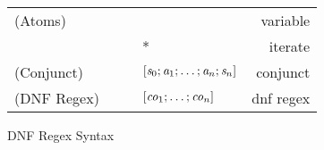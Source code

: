 \begin{figure}
\begin{tabular}{l@{\ }l@{\ }c@{\ }l@{\ }r}

(Atoms)& \Atom{} & \GEq{} & \RegexVariable{} & variable\\
& & &\GBar{} \DNFRegex{}* & iterate \\
(Conjunct)& \Conjunct{} & \GEq{} &
$[\mathit{s}_0;\mathit{a}_1;\ldots;\mathit{a}_n;\mathit{s}_n]$ & conjunct\\
(DNF Regex)& \DNFRegex{} & \GEq{} & $[\mathit{co}_1;\ldots;\mathit{co}_n]$ & dnf regex\\
\end{tabular}
\caption{DNF Regex Syntax}
\label{fig:dnf-regex-syntax}
\end{figure}
